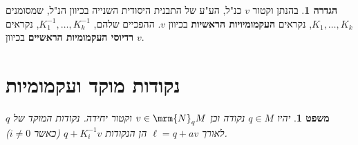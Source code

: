 \documentclass{article}
\newtheorem{theorem}{משפט}
\theoremstyle{definition}
\newtheorem*{definition*}{הגדרה}
\begin{document}
	\begin{definition*}
		בהנתן וקטור \(v\) כנ"ל,
		הע"ע של התבנית היסודית השנייה בכיוון הנ"ל,
		שמסומנים
		\(K_1,\dotsc,K_k\),
		נקראים \textbf{העקמומיויות הראשיות} בכיוון \(v\).
		ההפכיים שלהם,
		\(K_1^{-1},\dotsc,K_k^{-1}\),
		נקראים \textbf{רדיוסי העקמומיות הראשיים} בכיוון \(v\).
	\end{definition*}



	\section{נקודות מוקד ועקמומיות}
	
	\begin{theorem}
		יהיו
		\(q\in M\)
		נקודה וכן
		\(v\in\mrm{N}_q M\)
		וקטור יחידה.
		נקודות המוקד של \(q\) לאורך
		\(\ell = q+av\)
		הן הנקודות
		\(q + K_i^{-1} v\)
		(כאשר \(i\neq 0\)).
	\end{theorem}
\end{document}
